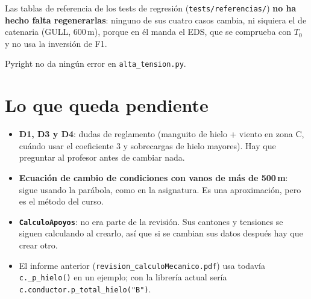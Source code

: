 \documentclass[11pt,a4paper]{article}
\newcommand{\code}[1]{\texttt{#1}}
\begin{document}
Las tablas de referencia de los tests de regresión (\code{tests/referencias/}) \textbf{no ha hecho falta regenerarlas}: ninguno de sus cuatro casos cambia, ni siquiera el de catenaria (GULL, 600\,m), porque en él manda el EDS, que se comprueba con $T_0$ y no usa la inversión de F1.

Pyright no da ningún error en \code{alta\_tension.py}.

\section{Lo que queda pendiente}
\label{sec:pendiente}

\begin{itemize}[leftmargin=1.5em]
  \item \textbf{D1, D3 y D4}: dudas de reglamento (manguito de hielo + viento en zona C, cuándo usar el coeficiente 3 y sobrecargas de hielo mayores). Hay que preguntar al profesor antes de cambiar nada.
  \item \textbf{Ecuación de cambio de condiciones con vanos de más de 500\,m}: sigue usando la parábola, como en la asignatura. Es una aproximación, pero es el método del curso.
  \item \textbf{\code{CalculoApoyos}}: no era parte de la revisión. Sus cantones y tensiones se siguen calculando al crearlo, así que si se cambian sus datos después hay que crear otro.
  \item El informe anterior (\code{revision\_calculoMecanico.pdf}) usa todavía \code{c.\_p\_hielo()} en un ejemplo; con la librería actual sería \code{c.conductor.p\_total\_hielo("B")}.
\end{itemize}
\end{document}
